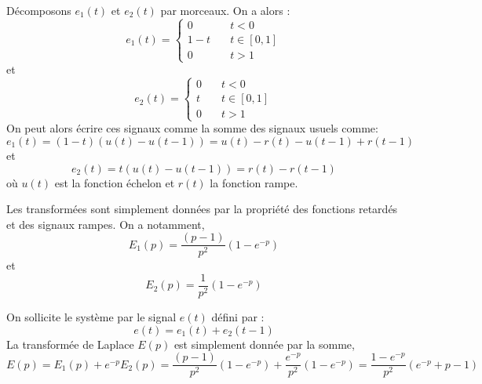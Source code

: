 Décomposons $e_1(t)$ et $e_2(t)$ par morceaux. On a alors :
\[
e_1(t)=
\begin{cases}
    0&\quad t<0\\
    1-t&\quad t\in[0,1]\\
    0&\quad t>1
\end{cases}
\]
et
\[
e_2(t)=
\begin{cases}
    0&\quad t<0\\
    t&\quad t\in[0,1]\\
    0&\quad t>1
\end{cases}
\]
On peut alors écrire ces signaux comme la somme des signaux usuels comme:
\[
    e_1(t)=(1-t)\left(u(t)-u(t-1)\right)=u(t)-r(t)-u(t-1)+r(t-1)
\]
et
\[
    e_2(t)=t\left(u(t)-u(t-1)\right)=r(t)-r(t-1)
\]
où $u(t)$ est la fonction échelon et $r(t)$ la fonction rampe.

Les transformées sont simplement données par la propriété des fonctions 
retardés et des signaux rampes. On a notamment,
\[
    E_1(p)=\dfrac{(p-1)}{p^2}\left(1-e^{-p}\right)
\]
et
\[
    E_2(p)=\dfrac{1}{p^2}\left(1-e^{-p}\right)
\]

On sollicite le système par le signal $e(t)$ défini par :
\[
    e(t)=e_1(t)+e_2(t-1)
\]
La transformée de Laplace $E(p)$ est simplement donnée par la somme,
\[
    E(p)=E_1(p)+e^{-p} E_2(p)
        =\dfrac{(p-1)}{p^2}\left(1-e^{-p}\right)+
         \dfrac{e^{-p}}{p^2}\left(1-e^{-p}\right)
        =\dfrac{1-e^{-p}}{p^2}\left(e^{-p}+p-1\right)
\]

